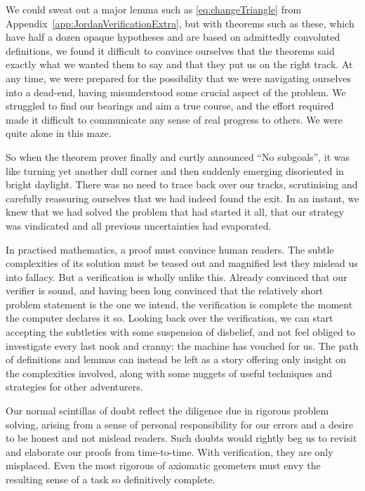 We could sweat out a major lemma such as \ref{eq:changeTriangle} from Appendix~\ref{app:JordanVerificationExtra}, but with theorems such as these, which have half a dozen opaque hypotheses and are based on admittedly convoluted definitions, we found it difficult to convince ourselves that the theorems said exactly what we wanted them to say and that they put us on the right track. 
At any time, we were prepared for the possibility that we were navigating ourselves into a dead-end, having misunderstood some crucial aspect of the problem. We struggled to find our bearings and aim a true course, and the effort required made it difficult to communicate any sense of real progress to others. We were quite alone in this maze.

So when the theorem prover finally and curtly announced ``No subgoals'', it was like turning yet another dull corner and then suddenly emerging disoriented in bright daylight. There was no need to trace back over our tracks, scrutinising and carefully reassuring ourselves that we had indeed found the exit. In an instant, we knew that we had solved the problem that had started it all, that our strategy was vindicated and all previous uncertainties had evaporated.

In practised mathematics, a proof must convince human readers. The subtle complexities of its solution must be teased out and magnified lest they mislead us into fallacy. But a verification is wholly unlike this. Already convinced that our verifier is sound, and having been long convinced that the relatively short problem statement is the one we intend, the verification is complete the moment the computer declares it so. Looking back over the verification, we can start accepting the subtleties with some suspension of disbelief, and not feel obliged to investigate every last nook and cranny: the machine has vouched for us. The path of definitions and lemmas can instead be left as a story offering only insight on the complexities involved, along with some nuggets of useful techniques and strategies for other adventurers.

Our normal scintillas of doubt reflect the diligence due in rigorous problem solving, arising from a sense of personal responsibility for our errors and a desire to be honest and not mislead readers. Such doubts would rightly beg us to revisit and elaborate our proofs from time-to-time. With verification, they are only misplaced. Even the most rigorous of axiomatic geometers must envy the resulting sense of a task so definitively complete.

